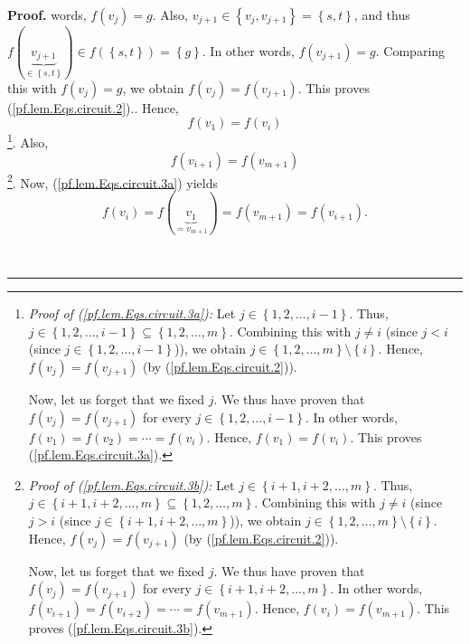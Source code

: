 \documentclass[numbers=enddot,12pt,final,onecolumn,notitlepage]{scrartcl}%
\theoremstyle{definition}
\newenvironment{proof}[1][Proof]{\noindent\textbf{#1.} }{\ \rule{0.5em}{0.5em}}
\newenvironment{verlong}{}{}
\begin{document}
\begin{verlong}
\begin{proof}
{words, $f\left(  v_{j}\right)  =g$. Also, $v_{j+1}\in\left\{  v_{j}%
,v_{j+1}\right\}  =\left\{  s,t\right\}  $, and thus $f\left(
\underbrace{v_{j+1}}_{\in\left\{  s,t\right\}  }\right)  \in f\left(  \left\{
s,t\right\}  \right)  =\left\{  g\right\}  $. In other words, $f\left(
v_{j+1}\right)  =g$. Comparing this with $f\left(  v_{j}\right)  =g$, we
obtain $f\left(  v_{j}\right)  =f\left(  v_{j+1}\right)  $. This proves
(\ref{pf.lem.Eqs.circuit.2}).}. Hence,%
\begin{equation}
f\left(  v_{1}\right)  =f\left(  v_{i}\right)  \label{pf.lem.Eqs.circuit.3a}%
\end{equation}
\footnote{\textit{Proof of (\ref{pf.lem.Eqs.circuit.3a}):} Let $j\in\left\{
1,2,\ldots,i-1\right\}  $. Thus, $j\in\left\{  1,2,\ldots,i-1\right\}
\subseteq\left\{  1,2,\ldots,m\right\}  $. Combining this with $j\neq i$
(since $j<i$ (since $j\in\left\{  1,2,\ldots,i-1\right\}  $)), we obtain
$j\in\left\{  1,2,\ldots,m\right\}  \setminus\left\{  i\right\}  $. Hence,
$f\left(  v_{j}\right)  =f\left(  v_{j+1}\right)  $ (by
(\ref{pf.lem.Eqs.circuit.2})).
\par
Now, let us forget that we fixed $j$. We thus have proven that $f\left(
v_{j}\right)  =f\left(  v_{j+1}\right)  $ for every $j\in\left\{
1,2,\ldots,i-1\right\}  $. In other words, $f\left(  v_{1}\right)  =f\left(
v_{2}\right)  =\cdots=f\left(  v_{i}\right)  $. Hence, $f\left(  v_{1}\right)
=f\left(  v_{i}\right)  $. This proves (\ref{pf.lem.Eqs.circuit.3a}).}. Also,%
\begin{equation}
f\left(  v_{i+1}\right)  =f\left(  v_{m+1}\right)
\label{pf.lem.Eqs.circuit.3b}%
\end{equation}
\footnote{\textit{Proof of (\ref{pf.lem.Eqs.circuit.3b}):} Let $j\in\left\{
i+1,i+2,\ldots,m\right\}  $. Thus, $j\in\left\{  i+1,i+2,\ldots,m\right\}
\subseteq\left\{  1,2,\ldots,m\right\}  $. Combining this with $j\neq i$
(since $j>i$ (since $j\in\left\{  i+1,i+2,\ldots,m\right\}  $)), we obtain
$j\in\left\{  1,2,\ldots,m\right\}  \setminus\left\{  i\right\}  $. Hence,
$f\left(  v_{j}\right)  =f\left(  v_{j+1}\right)  $ (by
(\ref{pf.lem.Eqs.circuit.2})).
\par
Now, let us forget that we fixed $j$. We thus have proven that $f\left(
v_{j}\right)  =f\left(  v_{j+1}\right)  $ for every $j\in\left\{
i+1,i+2,\ldots,m\right\}  $. In other words, $f\left(  v_{i+1}\right)
=f\left(  v_{i+2}\right)  =\cdots=f\left(  v_{m+1}\right)  $. Hence, $f\left(
v_{i}\right)  =f\left(  v_{m+1}\right)  $. This proves
(\ref{pf.lem.Eqs.circuit.3b}).}. Now, (\ref{pf.lem.Eqs.circuit.3a}) yields%
\[
f\left(  v_{i}\right)  =f\left(  \underbrace{v_{1}}_{=v_{m+1}}\right)
=f\left(  v_{m+1}\right)  =f\left(  v_{i+1}\right)  .
\]



\end{proof}
\end{verlong}
\end{document}
